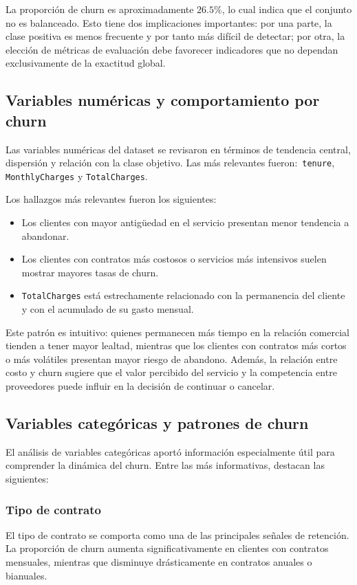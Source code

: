 \documentclass[conference]{IEEEtran}
\begin{document}
La proporción de churn es aproximadamente $26.5\%$, lo cual indica que el conjunto no es balanceado. Esto tiene dos implicaciones importantes: por una parte, la clase positiva es menos frecuente y por tanto más difícil de detectar; por otra, la elección de métricas de evaluación debe favorecer indicadores que no dependan exclusivamente de la exactitud global.

\subsection{Variables numéricas y comportamiento por churn}
Las variables numéricas del dataset se revisaron en términos de tendencia central, dispersión y relación con la clase objetivo. Las más relevantes fueron:\
\texttt{tenure}, \texttt{MonthlyCharges} y \texttt{TotalCharges}.

Los hallazgos más relevantes fueron los siguientes:
\begin{itemize}[leftmargin=*]
 \item Los clientes con mayor antigüedad en el servicio presentan menor tendencia a abandonar.
 \item Los clientes con contratos más costosos o servicios más intensivos suelen mostrar mayores tasas de churn.
 \item \texttt{TotalCharges} está estrechamente relacionado con la permanencia del cliente y con el acumulado de su gasto mensual.
\end{itemize}

Este patrón es intuitivo: quienes permanecen más tiempo en la relación comercial tienden a tener mayor lealtad, mientras que los clientes con contratos más cortos o más volátiles presentan mayor riesgo de abandono. Además, la relación entre costo y churn sugiere que el valor percibido del servicio y la competencia entre proveedores puede influir en la decisión de continuar o cancelar.

\subsection{Variables categóricas y patrones de churn}
El análisis de variables categóricas aportó información especialmente útil para comprender la dinámica del churn. Entre las más informativas, destacan las siguientes:

\subsubsection{Tipo de contrato}
El tipo de contrato se comporta como una de las principales señales de retención. La proporción de churn aumenta significativamente en clientes con contratos mensuales, mientras que disminuye drásticamente en contratos anuales o bianuales.
\end{document}
